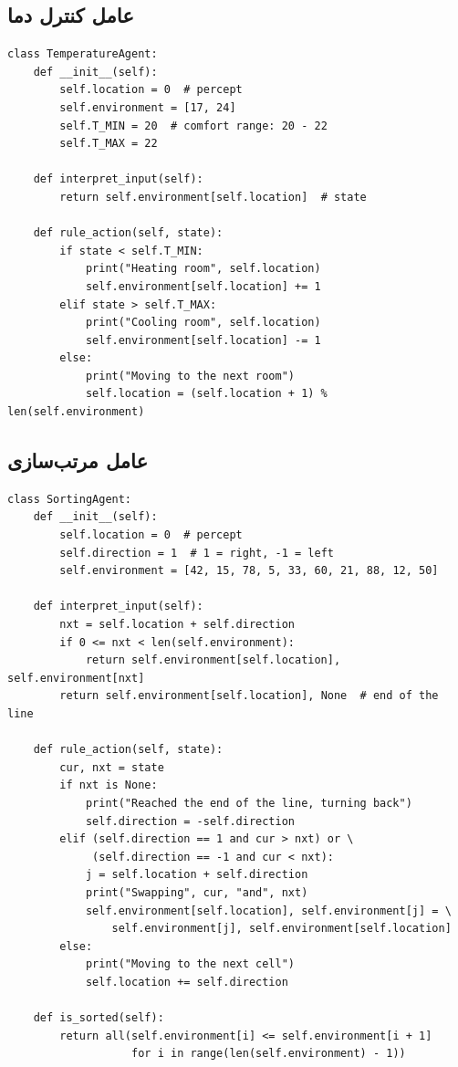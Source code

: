 \documentclass[12pt,a4paper]{article}
\theoremstyle{definition}
\begin{document}
\subsection{عامل کنترل دما}
\begin{latin}
\begin{lstlisting}[caption={عامل کنترل دما در دو اتاق}]
class TemperatureAgent:
    def __init__(self):
        self.location = 0  # percept
        self.environment = [17, 24]
        self.T_MIN = 20  # comfort range: 20 - 22
        self.T_MAX = 22

    def interpret_input(self):
        return self.environment[self.location]  # state

    def rule_action(self, state):
        if state < self.T_MIN:
            print("Heating room", self.location)
            self.environment[self.location] += 1
        elif state > self.T_MAX:
            print("Cooling room", self.location)
            self.environment[self.location] -= 1
        else:
            print("Moving to the next room")
            self.location = (self.location + 1) % len(self.environment)
\end{lstlisting}
\end{latin}

\subsection{عامل مرتب‌سازی}
\begin{latin}
\begin{lstlisting}[caption={عامل مرتب‌سازی ده جرم در محیط خطی}]
class SortingAgent:
    def __init__(self):
        self.location = 0  # percept
        self.direction = 1  # 1 = right, -1 = left
        self.environment = [42, 15, 78, 5, 33, 60, 21, 88, 12, 50]

    def interpret_input(self):
        nxt = self.location + self.direction
        if 0 <= nxt < len(self.environment):
            return self.environment[self.location], self.environment[nxt]
        return self.environment[self.location], None  # end of the line

    def rule_action(self, state):
        cur, nxt = state
        if nxt is None:
            print("Reached the end of the line, turning back")
            self.direction = -self.direction
        elif (self.direction == 1 and cur > nxt) or \
             (self.direction == -1 and cur < nxt):
            j = self.location + self.direction
            print("Swapping", cur, "and", nxt)
            self.environment[self.location], self.environment[j] = \
                self.environment[j], self.environment[self.location]
        else:
            print("Moving to the next cell")
            self.location += self.direction

    def is_sorted(self):
        return all(self.environment[i] <= self.environment[i + 1]
                   for i in range(len(self.environment) - 1))
\end{lstlisting}
\end{latin}
\end{document}

